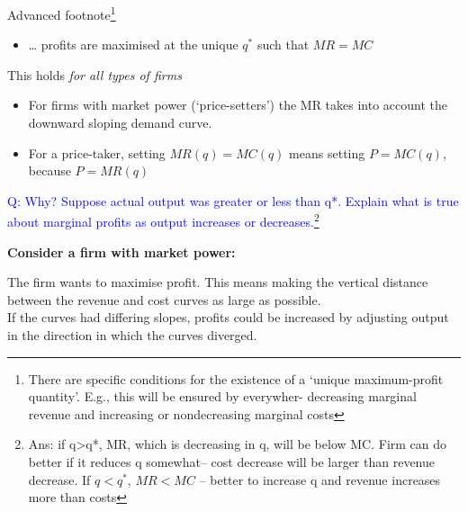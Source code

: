 \documentclass[]{article}
\providecommand{\tightlist}{%
  \setlength{\itemsep}{0pt}\setlength{\parskip}{0pt}}
\begin{document}
\textcolor{RawSienna}{Advanced footnote}\footnote{There are specific
  conditions for the existence of a `unique maximum-profit quantity'.
  E.g., this will be ensured by everywher- decreasing marginal revenue
  and increasing or nondecreasing marginal costs}

\begin{itemize}
\tightlist
\item
  \ldots{} profits are maximised at the unique \(q^*\) such that
  \(MR=MC\)
\end{itemize}

\bigskip

This holds \emph{for all types of firms}

\begin{itemize}
\item
  For firms with market power (`price-setters') the MR takes into
  account the downward sloping demand curve.
\item
  For a price-taker, setting \(MR(q)=MC(q)\) means setting \(P=MC(q)\),
  because \(P=MR(q)\)
\end{itemize}

\textcolor{blue}{Q:  Why? Suppose actual output was greater or less than q*.
Explain what is true about marginal profits as output increases or decreases.}\footnote{Ans:
  if q\textgreater q*, MR, which is decreasing in q, will be below MC.
  Firm can do better if it reduces q somewhat-- cost decrease will be
  larger than revenue decrease. If \(q<q^{\ast}\), \(MR<MC\) -- better
  to increase q and revenue increases more than costs}

\textbf{Consider a firm with market power:}

The firm wants to maximise profit. This means making the vertical
distance between the revenue and cost curves as large as possible.\\
If the curves had differing slopes, profits could be increased by
adjusting output in the direction in which the curves diverged.
\end{document}
